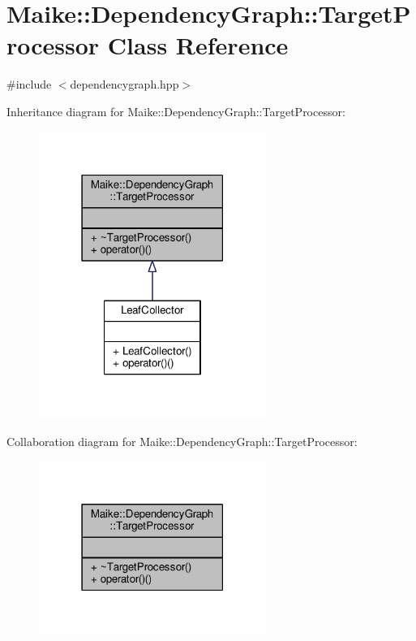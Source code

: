 \hypertarget{class_maike_1_1_dependency_graph_1_1_target_processor}{}\section{Maike\+:\+:Dependency\+Graph\+:\+:Target\+Processor Class Reference}
\label{class_maike_1_1_dependency_graph_1_1_target_processor}


{\ttfamily \#include $<$dependencygraph.\+hpp$>$}



Inheritance diagram for Maike\+:\+:Dependency\+Graph\+:\+:Target\+Processor\+:\nopagebreak
\begin{figure}[H]
\begin{center}
\leavevmode
\includegraphics[width=210pt]{class_maike_1_1_dependency_graph_1_1_target_processor__inherit__graph}
\end{center}
\end{figure}


Collaboration diagram for Maike\+:\+:Dependency\+Graph\+:\+:Target\+Processor\+:\nopagebreak
\begin{figure}[H]
\begin{center}
\leavevmode
\includegraphics[width=210pt]{class_maike_1_1_dependency_graph_1_1_target_processor__coll__graph}
\end{center}
\end{figure}
